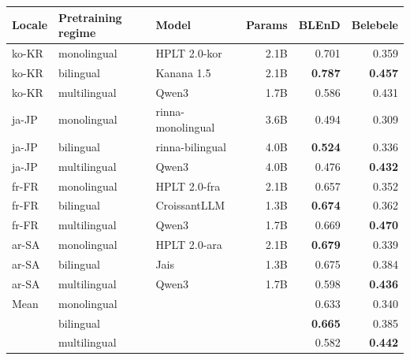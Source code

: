 \begin{table}[t]
\centering
\small
{}
\label{tab:regime_ge1b}
\begin{tabular}{lllrrr}
\toprule
Locale & Pretraining regime & Model & Params & BLEnD & Belebele \\
\midrule
ko-KR & monolingual & HPLT 2.0-kor & 2.1B & 0.701 & 0.359 \\
ko-KR & bilingual & Kanana 1.5 & 2.1B & \textbf{0.787} & \textbf{0.457} \\
ko-KR & multilingual & Qwen3 & 1.7B & 0.586 & 0.431 \\
\midrule
ja-JP & monolingual & rinna-monolingual & 3.6B & 0.494 & 0.309 \\
ja-JP & bilingual & rinna-bilingual & 4.0B & \textbf{0.524} & 0.336 \\
ja-JP & multilingual & Qwen3 & 4.0B & 0.476 & \textbf{0.432} \\
\midrule
fr-FR & monolingual & HPLT 2.0-fra & 2.1B & 0.657 & 0.352 \\
fr-FR & bilingual & CroissantLLM & 1.3B & \textbf{0.674} & 0.362 \\
fr-FR & multilingual & Qwen3 & 1.7B & 0.669 & \textbf{0.470} \\
\midrule
ar-SA & monolingual & HPLT 2.0-ara & 2.1B & \textbf{0.679} & 0.339 \\
ar-SA & bilingual & Jais & 1.3B & 0.675 & 0.384 \\
ar-SA & multilingual & Qwen3 & 1.7B & 0.598 & \textbf{0.436} \\
\midrule
Mean & monolingual & & & 0.633 & 0.340 \\
 & bilingual & & & \textbf{0.665} & 0.385 \\
 & multilingual & & & 0.582 & \textbf{0.442} \\
\bottomrule
\end{tabular}
\end{table}
